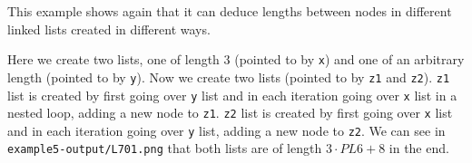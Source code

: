 This example shows again that it can deduce lengths between nodes in different linked lists created in different ways.

Here we create two lists, one of length 3 (pointed to by \texttt{x}) and one of an arbitrary length (pointed to by \texttt{y}). Now we create two lists (pointed to by \texttt{z1} and \texttt{z2}). \texttt{z1} list is created by first going over \texttt{y} list and in each iteration going over \texttt{x} list in a nested loop, adding a new node to \texttt{z1}. \texttt{z2} list is created by first going over \texttt{x} list and in each iteration going over \texttt{y} list, adding a new node to \texttt{z2}. We can see in \texttt{example5-output/L701.png} that both lists are of length $3\cdot PL6 + 8$ in the end. 
